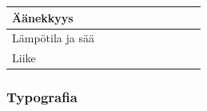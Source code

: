 \documentclass[finnish, 12pt, a4paper, elec, utf8, a-1b, online]{aaltothesis}
\begin{document}
{\begin{longtable}{p{2.5cm}|p{6cm}|p{0.5cm}p{0.5cm}p{0.5cm}|p{0.5cm}|p{0.5cm}p{0.5cm}p{0.5cm}|p{0.5cm}|}
        \midrule
        Äänekkyys                                                                                                                                                                                                                                                                                                                                                                                                                   \\
        \midrule
        Lämpötila ja sää                                                                                                                                                                                                                                                                                                                                                                                                            \\
        \midrule
        Liike                                                                                                                                                                                                                                                                                                                                                                                                                       \\
    \end{longtable}
}

\subsubsection{Typografia}
\end{document}
